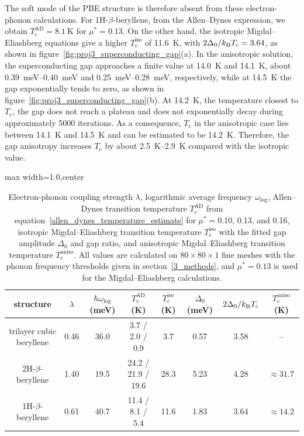 The soft mode of the PBE structure is therefore absent from these electron-phonon calculations.
For 1H-$\beta$-beryllene,
from the Allen--Dynes expression,
we obtain $T_\mathrm{c}^{\mathrm{AD}}=\qty{8.1}{\kelvin}$ for $\mu^*=0.13$.
On the other hand,
the isotropic Migdal--Eliashberg equations give a higher $T_\mathrm{c}^{\mathrm{iso}}$ of \qty{11.6}{\kelvin},
with $2\Delta_0/k_\mathrm{B} T_\mathrm{c}=3.64$,
as shown in figure~\ref{fig:proj3_superconducting_gap}(a).
In the anisotropic solution,
the superconducting gap approaches a finite value at \qty{14.0}{\kelvin} and \qty{14.1}{\kelvin},
about \qtyrange{0.39}{0.40}{\milli\electronvolt} and \qtyrange{0.25}{0.28}{\milli\electronvolt}, respectively,
while at \qty{14.5}{\kelvin} the gap exponentially tends to zero,
as shown in figure~\ref{fig:proj3_superconducting_gap}(b).
At \qty{14.2}{\kelvin},
the temperature closest to $T_\mathrm{c}$,
the gap does not reach a plateau and does not exponentially decay during approximately 5000 iterations.
As a consequence,
$T_\mathrm{c}$ in the anisotropic case lies between \qty{14.1}{\kelvin} and \qty{14.5}{\kelvin} and can be estimated to be \qty{14.2}{\kelvin}.
Therefore, the gap anisotropy increases $T_\mathrm{c}$ by about \qtyrange{2.5}{2.9}{\kelvin} compared with the isotropic value.

\begin{table}[!htbp]
\centering
{}
\begin{adjustbox}{max width=1.0\linewidth,center}
\begin{tabular}{cccccccc}
\hline
\rowcolor{gray!25}
structure
& $\lambda$
& $\hbar\omega_\mathrm{log}$ (meV)
& $T_\mathrm{c}^{\mathrm{AD}}$ (K)
& $T_\mathrm{c}^{\mathrm{iso}}$ (K)
& $\Delta_0$ (meV)
& $2\Delta_0/k_\mathrm{B} T_\mathrm{c}$
& $T_\mathrm{c}^{\mathrm{aniso}}$ (K) \\
\hline
trilayer cubic beryllene
& 0.46 & 36.0 & 3.7 / 2.0 / 0.9 & 3.7 & 0.57 & 3.58 & -- \\
2H-$\beta$-beryllene
& 1.40 & 19.5 & 24.2 / 21.9 / 19.6 & 28.3 & 5.23 & 4.28 & $\approx 31.7$ \\
1H-$\beta$-beryllene
& 0.61 & 40.7 & 11.4 / 8.1 / 5.4 & 11.6 & 1.83 & 3.64 & $\approx 14.2$ \\
\hline
\end{tabular}
\end{adjustbox}
\caption{Electron-phonon coupling strength $\lambda$,
logarithmic average frequency $\omega_\mathrm{log}$,
Allen--Dynes transition temperature $T_\mathrm{c}^{\mathrm{AD}}$ from equation~\eqref{allen_dynes_temperature_estimate} for $\mu^*=0.10$, 0.13, and 0.16,
isotropic Migdal--Eliashberg transition temperature $T_\mathrm{c}^{\mathrm{iso}}$ with the fitted gap amplitude $\Delta_0$ and gap ratio,
and anisotropic Migdal--Eliashberg transition temperature $T_\mathrm{c}^{\mathrm{aniso}}$.
All values are calculated on $80 \times 80 \times 1$ fine meshes with the phonon frequency thresholds given in section~\ref{3_methods},
and $\mu^*=0.13$ is used for the Migdal--Eliashberg calculations.}
\label{tab:proj3_superconductivity}
\end{table}

